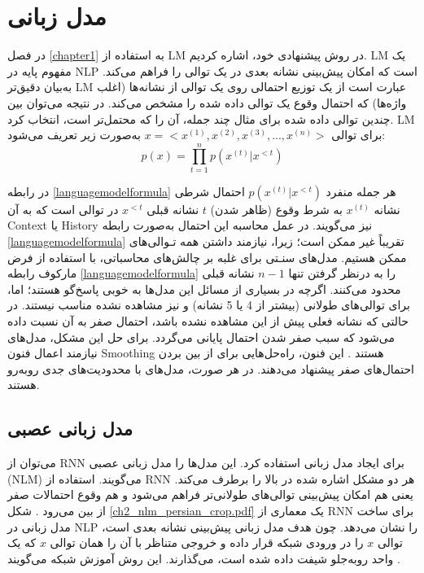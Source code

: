  
 \section{مدل زبانی}\label{sec:language_model}
 در فصل 
 \ref{chapter1}
 به استفاده از \gls{LM} در روش پیشنهادی خود، اشاره کردیم. 
 \gls{LM} 
 یک مفهوم پایه در \gls{NLP} است که امکان پیش‌بینی نشانه بعدی در یک توالی را فراهم می‌کند. به‌بیان دقیق‌تر \gls{LM} عبارت است از یک توزیع احتمالی روی یک توالی از نشانه‌ها (اغلب واژه‌ها) که احتمال وقوع یک توالی داده شده را مشخص می‌کند. در نتیجه می‌توان بین چندین توالی داده شده برای مثال چند جمله، آن را که محتمل‌تر است، انتخاب کرد. 
 \gls{LM}  
 برای توالی 
 $ x = <x^{(1)}, x^{(2)}, x^{(3)}, ..., x^{(n)}> $
 به‌صورت زیر تعریف می‌شود\cite{Luong2016}:
 \begin{equation}\label{languagemodelformula}
 	p(x) = \prod_{t=1}^{n}p(x^{(t)}|x^{ <t})
 \end{equation} 
 
 
 در رابطه \ref{languagemodelformula} هر جمله منفرد 
 $ p(x^{(t)}|x^{ <t}) $
 احتمال شرطی نشانه 
 $ x^{(t)} $
 به شرط وقوع (ظاهر شدن) $ t $ نشانه قبلی  $ x^{ <t} $ در توالی است که به آن \gls{Context} یا \gls{History} نیز می‌گویند. در عمل محاسبه این احتمال به‌صورت رابطه \ref{languagemodelformula} تقریباً غیر ممکن است؛ زیرا، نیازمند داشتن همه تـوالی‌های ممکن هستیم. مدل‌های سنـتی  برای غلبه بر چالش‌های محاسباتی، با استفاده از فرض مارکوف رابطه \ref{languagemodelformula} را به درنظر گرفتن تنها $ n-1 $ نشانه قبلی محدود می‌کنند. اگرچه در بسیاری از مسائل این مدل‌ها به خوبی پاسخ‌گو هستند؛ اما، برای توالی‌های طولانی (بیشتر از 4 یا 5 نشانه) و نیز مشاهده نشده مناسب نیستند. در حالتی که نشانه فعلی پیش‌ از این مشاهده نشده باشد، احتمال صفر به آن نسبت داده می‌شود که سبب صفر شدن احتمال پایانی می‌گردد. برای حل این مشکل، مدل‌های  نیازمند اعمال فنون \gls{Smoothing} هستند \cite{Jurafsky2017}. این فنون، راه‌حل‌هایی برای از بین بردن احتمال‌های صفر پیشنهاد می‌دهند. در هر صورت، مدل‌های  با محدودیت‌های جدی روبه‌رو هستند.


 
\subsection{مدل زبانی عصبی}
  می‌توان از \gls{RNN} برای ایجاد مدل زبانی استفاده کرد. این مدل‌ها را مدل زبانی عصبی (\gls{NLM}) می‌گویند. استفاده از \gls{RNN} هر دو مشکل اشاره شده در بالا را برطرف می‌کند. یعنی هم امکان پیش‌بینی توالی‌های طولانی‌تر فراهم می‌شود و هم وقوع احتمالات صفر از بین می‌رود \cite{Luong2016}.  شکل \ref{ch2_nlm_persian_crop.pdf} یک معماری از \gls{RNN} برای ساخت مدل زبانی در \gls{NLP} را نشان می‌دهد. چون هدف مدل زبانی پیش‌بینی نشانه بعدی است، توالی $ x $  را در ورودی شبکه قرار داده و خروجی متناظر با آن را همان توالی $ x $ که یک واحد روبه‌جلو شیفت داده شده است، می‌گذارند. این روش آموزش شبکه  می‌گویند \cite{Goodfellow-et-al-2016}.
  
